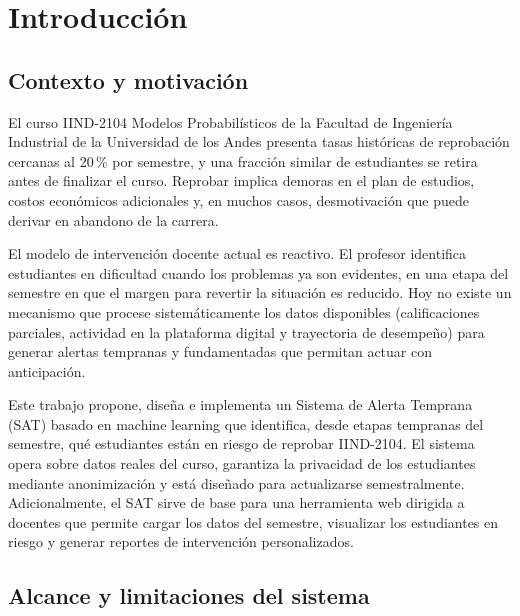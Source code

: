 \documentclass[12pt, letterpaper, openany]{report}
\begin{document}
\clearpage
\hypersetup{pageanchor=true}

\chapter{Introducción}
\label{chap:intro}

\section{Contexto y motivación}

El curso IIND-2104 Modelos Probabilísticos de la Facultad de Ingeniería 
Industrial de la Universidad de los Andes presenta tasas históricas de 
reprobación cercanas al 20\,\% por semestre, y una fracción similar de 
estudiantes se retira antes de finalizar el curso. Reprobar implica 
demoras en el plan de estudios, costos económicos adicionales y, en 
muchos casos, desmotivación que puede derivar en abandono de la carrera.

El modelo de intervención docente actual es reactivo. El profesor 
identifica estudiantes en dificultad cuando los problemas ya son 
evidentes, en una etapa del semestre en que el margen para revertir 
la situación es reducido. Hoy no existe un mecanismo que procese 
sistemáticamente los datos disponibles (calificaciones parciales, 
actividad en la plataforma digital y trayectoria de desempeño) para 
generar alertas tempranas y fundamentadas que permitan actuar con 
anticipación.

Este trabajo propone, diseña e implementa un Sistema de Alerta Temprana 
(SAT) basado en machine learning que identifica, desde etapas tempranas 
del semestre, qué estudiantes están en riesgo de reprobar IIND-2104. 
El sistema opera sobre datos reales del curso, garantiza la privacidad 
de los estudiantes mediante anonimización y está diseñado para 
actualizarse semestralmente. Adicionalmente, el SAT sirve de base para 
una herramienta web dirigida a docentes que permite cargar los datos 
del semestre, visualizar los estudiantes en riesgo y generar reportes 
de intervención personalizados.

\section{Alcance y limitaciones del sistema}
\end{document}
